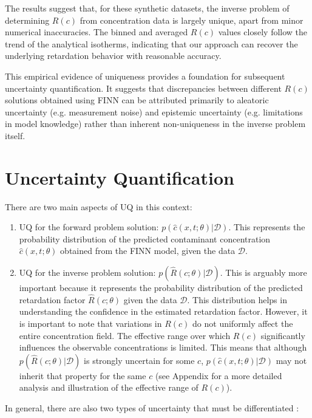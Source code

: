 The results suggest that, for these synthetic datasets, the inverse problem of determining $R(c)$ from concentration data is largely unique, apart from minor numerical inaccuracies. The binned and averaged $R(c)$ values closely follow the trend of the analytical isotherms, indicating that our approach can recover the underlying retardation behavior with reasonable accuracy.

This empirical evidence of uniqueness provides a foundation for subsequent uncertainty quantification. It suggests that discrepancies between different $R(c)$ solutions obtained using FINN can be attributed primarily to aleatoric uncertainty (e.g. measurement noise) and epistemic uncertainty (e.g. limitations in model knowledge) rather than inherent non-uniqueness in the inverse problem itself.




\section{Uncertainty Quantification}
There are two main aspects of UQ in this context:
\begin{enumerate}
    \item UQ for the forward problem solution: $p(\hat{c}(x,t;\theta) | \mathcal{D})$. This represents the probability distribution of the predicted contaminant concentration $\hat{c}(x,t;\theta)$ obtained from the FINN model, given the data $\mathcal{D}$.
    \item UQ for the inverse problem solution: $p(\hat{R}(c;\theta) | \mathcal{D})$. This is arguably more important because it represents the probability distribution of the predicted retardation factor $\hat{R}(c;\theta)$ given the data $\mathcal{D}$. This distribution helps in understanding the confidence in the estimated retardation factor. However, it is important to note that variations in $R(c)$ do not uniformly affect the entire concentration field. The effective range over which $R(c)$ significantly influences the observable concentrations is limited. This means that although $p(\hat{R}(c;\theta) | \mathcal{D})$ is strongly uncertain for some $c$, $p(\hat{c}(x,t;\theta) | \mathcal{D})$ may not inherit that property for the same $c$ (see Appendix for a more detailed analysis and illustration of the effective range of $R(c)$).
\end{enumerate}

In general, there are also two types of uncertainty that must be differentiated \cite{depeweg2018decomposition, gawlikowski2023survey}:

